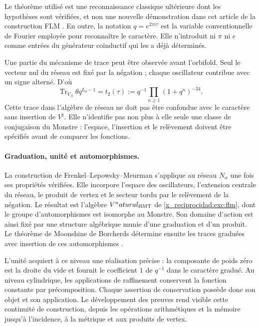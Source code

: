 Le théorème utilisé est une reconnaissance classique ultérieure dont les hypothèses sont vérifiées, et non une nouvelle démonstration dans cet article de la construction FLM \cite{x_reciprocidad:flm}. En outre, la notation $q=e^{2\pi i\tau}$ est la variable conventionnelle de Fourier employée pour reconnaître le caractère. Elle n'introduit ni $\pi$ ni $e$ comme entrées du générateur coinductif qui les a déjà déterminés.

Une partie du mécanisme de trace peut être observée avant l'orbifold.
Seul le vecteur nul du réseau est fixé par la négation ; chaque
oscillateur contribue avec un signe alterné. D'où
\[
 \operatorname{Tr}_{V_\Lambda}\theta q^{L_0-1}
   =t_2(\tau)
   :=q^{-1}\prod_{n\geq1}(1+q^n)^{-24}.
\]
Cette trace dans l'algèbre de réseau ne doit pas être confondue avec le
caractère sans insertion de $V^\natural$. Elle n'identifie pas non plus à elle
seule une classe de conjugaison du Monstre : l'espace, l'insertion
et le relèvement doivent être spécifiés avant de comparer les fonctions.


\paragraph{Graduation, unité et automorphismes.}
\label{x_reciprocidad:inc-ampl-automorfismos}
La construction de Frenkel--Lepowsky--Meurman s'applique au réseau
$N_\alpha$ une fois ses propriétés vérifiées. Elle incorpore l'espace
des oscillateurs, l'extension centrale du réseau, le produit de vertex
et le secteur tordu par le relèvement de la négation. Le résultat est
l'algèbre $V^\natural_{\rm HMT}$ de \eqref{x_reciprocidad:exc:flm}, dont le groupe
d'automorphismes est isomorphe au Monstre. Son domaine d'action est ainsi
fixé par une structure algébrique munie d'une graduation et d'un produit. Le théorème
de Moonshine de Borcherds détermine ensuite les traces graduées
avec insertion de ces automorphismes \cite{x_reciprocidad:flm,x_reciprocidad:borcherds}.

L'unité acquiert à ce niveau une réalisation précise : la composante
de poids zéro est la droite du vide et fournit le coefficient $1$ de
$q^{-1}$ dans le caractère gradué. Au niveau cylindrique, les
applications de raffinement conservent la fonction constante par
précomposition. Chaque assertion de conservation possède donc son
objet et son application. Le développement des preuves rend visible cette
continuité de construction, depuis les opérations arithmétiques et la
mémoire jusqu'à l'incidence, à la métrique et aux produits de vertex.

